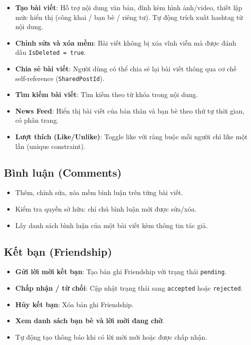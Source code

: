 \documentclass[a4paper]{article}
\begin{document}
\begin{itemize}
    \item \textbf{Tạo bài viết}: Hỗ trợ nội dung văn bản, đính kèm hình ảnh/video, thiết lập mức hiển thị (công khai / bạn bè / riêng tư). Tự động trích xuất hashtag từ nội dung.
    \item \textbf{Chỉnh sửa và xóa mềm}: Bài viết không bị xóa vĩnh viễn mà được đánh dấu \texttt{IsDeleted = true}.
    \item \textbf{Chia sẻ bài viết}: Người dùng có thể chia sẻ lại bài viết thông qua cơ chế self-reference (\texttt{SharedPostId}).
    \item \textbf{Tìm kiếm bài viết}: Tìm kiếm theo từ khóa trong nội dung.
    \item \textbf{News Feed}: Hiển thị bài viết của bản thân và bạn bè theo thứ tự thời gian, có phân trang.
    \item \textbf{Lượt thích (Like/Unlike)}: Toggle like với ràng buộc mỗi người chỉ like một lần (unique constraint).
\end{itemize}

\subsection{Bình luận (Comments)}

\begin{itemize}
    \item Thêm, chỉnh sửa, xóa mềm bình luận trên từng bài viết.
    \item Kiểm tra quyền sở hữu: chỉ chủ bình luận mới được sửa/xóa.
    \item Lấy danh sách bình luận của một bài viết kèm thông tin tác giả.
\end{itemize}

\subsection{Kết bạn (Friendship)}

\begin{itemize}
    \item \textbf{Gửi lời mời kết bạn}: Tạo bản ghi Friendship với trạng thái \texttt{pending}.
    \item \textbf{Chấp nhận / từ chối}: Cập nhật trạng thái sang \texttt{accepted} hoặc \texttt{rejected}.
    \item \textbf{Hủy kết bạn}: Xóa bản ghi Friendship.
    \item \textbf{Xem danh sách bạn bè và lời mời đang chờ}.
    \item Tự động tạo thông báo khi có lời mời mới hoặc được chấp nhận.
\end{itemize}
\end{document}
